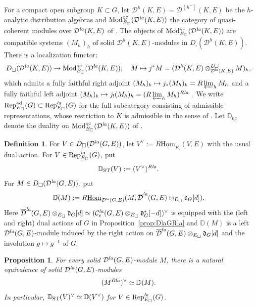 \documentclass[a4paper,10pt]{amsart}
\theoremstyle{remark}
\theoremstyle{definition}
\newtheorem{definition}[theorem]{Definition}
\theoremstyle{plain}
\newtheorem{proposition}[theorem]{Proposition}
\numberwithin{equation}{section}
\newcommand{\bbD}{{\mathbb D}}
\newcommand{\calC}{{\mathcal C}}
\newcommand{\calD}{{\mathcal D}}
\newcommand{\la}{{\it la}}
\newcommand{\Rep}{{\rm Rep}}
\newcommand{\ST}{{\rm ST}}
\begin{document}
For a compact open subgroup $K\subset G$, let $\calD^h(K,E)=\calD^{(h^+)}(K,E)$ be the $h$-analytic distribution algebras and $\mathrm{Mod}^{\mathrm{qc}}_{E_\square}(\calD^{\la}(K,E))$ the category of quasi-coherent modules over $\calD^{\la}(K,E)$ of \cite[Def.~4.1.1]{JC23}.  The objects of $\mathrm{Mod}^{\mathrm{qc}}_{E_\square}(\calD^{\la}(K,E))$ are compatible systems $(M_h)_h$ of solid $\calD^h(K,E)$-modules in $D_{\square}(\calD^h(K,E))$.  There is a localization functor:
\[
	D_{\square}(\calD^{\la}(K,E))\to \mathrm{Mod}^{\mathrm{qc}}_{E_\square}(\calD^{\la}(K,E)),\quad M\mapsto j^*M=(\calD^h(K,E)\otimes^{L\square}_{\calD^{\la}(K,E)}M)_h,
\]
which admits  a fully faithful right adjoint $(M_h)_h\mapsto j_*(M_h)_h=R\varprojlim_hM_h$ and a fully faithful left adjoint $(M_h)_h\mapsto j_!(M_h)_h=(R\varprojlim_hM_h)^{R\la}$ \cite[Lem.~4.1.4 \& Thm.~4.1.5]{JC23}.  We write $\Rep^{\mathrm{ad}}_{E_\square}(G)\subset \Rep^{\la}_{E_\square}(G)$ for the full subcategory consisting of admissible representations, whose restriction to $K$ is admissible in the sense of \cite[Def.~4.2.1]{JC23}.  Let $\bbD_{\mathrm{qc}}$ denote the duality on $\mathrm{Mod}^{\mathrm{qc}}_{E_\square}(\calD^{\la}(K,E))$ of \cite[Def.~4.1.11]{JC23}.

\begin{definition}\label{defSTdual}
For $V\in D_{\square}(\calD^{\la}(G,E))$, let $V^\vee:=R\underline{\mathrm{Hom}}_{E_\square}(V,E)$ with the usual dual action. For $V\in\Rep^{\la}_{E_\square}(G)$, put
\[
 \bbD_{\ST}(V):=(V^\vee)^{R\la}.
\]
For $M\in D_{\square}(\calD^{\la}(G,E))$, put
\[
 \bbD(M):= R\underline{\mathrm{Hom}}_{\calD^{\la}(G,E)}
 (M,\overline{\calD}^{\la}(G,E) \otimes_{E_{\square}}\mathfrak d_G[d]).
\]
Here $\overline{\calD}^{\la}(G,E) \otimes_{E_{\square}}\mathfrak d_G[d]\simeq (\calC_c^{\la}(G,E)\otimes_{E_\square}\mathfrak d_G^*[-d])^{\vee}$ is equipped with the (left and right) dual actions of $G$ in Proposition~\ref{prop:DlaGRla} and $\bbD(M)$ is a left $\calD^{\la}(G,E)$-module induced by the right action on $\overline{\calD}^{\la}(G,E) \otimes_{E_{\square}}\mathfrak d_G[d]$ and the involution  $g\mapsto g^{-1}$ of $G$.
\end{definition}

\begin{proposition}\label{prop:ST-linear-dual}
For every solid $\calD^{\la}(G,E)$-module $M$, there is a natural equivalence of solid $\calD^{\la}(G,E)$-modules
\[
 (M^{R\la})^\vee\simeq\bbD(M).
\]
In particular, $\bbD_{\ST}(V)^\vee\simeq\bbD(V^\vee)$ for $V\in\Rep^{\la}_{E_\square}(G)$.
\end{proposition}
\end{document}
